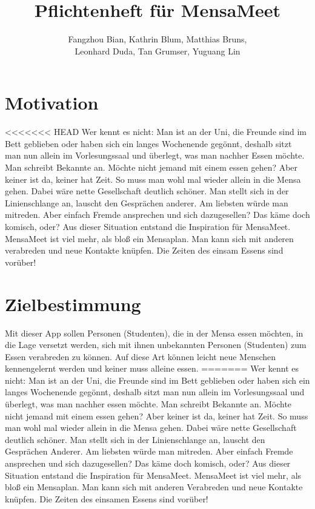\documentclass[a4paper]{scrreprt}
\begin{document}
\title{Pflichtenheft für MensaMeet}
\author{Fangzhou Bian, Kathrin Blum, Matthias Bruns, \\Leonhard Duda, Tan Grumser, Yuguang Lin}
\maketitle
\tableofcontents



\chapter{Motivation}

<<<<<<< HEAD
Wer kennt es nicht: Man ist an der Uni, die Freunde sind im Bett geblieben oder haben sich ein langes Wochenende gegönnt, deshalb sitzt man nun allein im Vorlesungssaal und überlegt, was man nachher Essen möchte. Man schreibt Bekannte an. Möchte nicht jemand mit einem essen gehen? Aber keiner ist da, keiner hat Zeit. So muss man wohl mal wieder allein in die Mensa gehen. Dabei wäre nette Gesellschaft deutlich schöner. Man stellt sich in der Linienschlange an, lauscht den Gesprächen anderer. Am liebsten würde man mitreden. Aber einfach Fremde ansprechen und sich dazugesellen? Das käme doch komisch, oder? Aus dieser Situation entstand die Inspiration für MensaMeet. MensaMeet ist viel mehr, als bloß ein Mensaplan. Man kann sich mit anderen verabreden und neue Kontakte knüpfen. Die Zeiten des einsam Essens sind vorüber!

\chapter{Zielbestimmung}
Mit dieser App sollen Personen (Studenten), die in der Mensa essen möchten, in die Lage versetzt werden, sich mit ihnen unbekannten Personen (Studenten) zum Essen verabreden zu können. Auf diese Art können leicht neue Menschen kennengelernt werden und keiner muss alleine essen.
=======
Wer kennt es nicht: Man ist an der Uni, die Freunde sind im Bett geblieben oder haben sich ein langes Wochenende gegönnt, deshalb sitzt man nun allein im Vorlesungssaal und überlegt, was man nachher essen möchte. Man schreibt Bekannte an. Möchte nicht jemand mit einem essen gehen? Aber keiner ist da, keiner hat Zeit. So muss man wohl mal wieder allein in die Mensa gehen. Dabei wäre nette Gesellschaft deutlich schöner. Man stellt sich in der Linienschlange an, lauscht den Gesprächen Anderer. Am liebsten würde man mitreden. Aber einfach Fremde ansprechen und sich dazugesellen? Das käme doch komisch, oder? Aus dieser Situation entstand die Inspiration für MensaMeet. MensaMeet ist viel mehr, als bloß ein Mensaplan. Man kann sich mit anderen Verabreden und neue Kontakte knüpfen. Die Zeiten des einsamen Essens sind vorüber!
\end{document}
